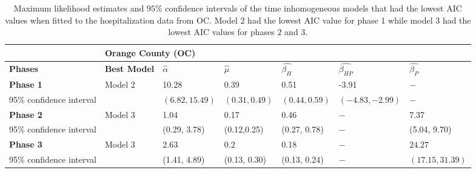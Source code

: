 \documentclass{article}
\begin{document}
\begin{appendices}
\begin{sidewaystable}[h]
\begin{tabular}{lllllll}
\hline
& \multicolumn{6}{l}{\textbf{Orange County (OC)}}\\ \hline
\textbf{Phases} & \textbf{Best Model} & $\hat{\alpha}$ & $\hat{\mu}$ & $\hat{\beta_{H}}$ & $\hat{\beta_{HP}}$ & $\hat{\beta_{P}}$\\ \hline
\textbf{Phase 1} & Model 2 & 10.28 & 0.39 & 0.51 & -3.91 & $-$\\ \hline
95\% confidence interval & & $(6.82, 15.49)$ & $(0.31, 0.49)$ & $(0.44, 0.59)$ & $(-4.83, -2.99)$ & $-$\\ \hline 
\textbf{Phase 2} & Model 3 & 1.04 & 0.17 & 0.46 & $-$ & 7.37 \\ \hline
95\% confidence interval & & (0.29, 3.78) & (0.12,0.25) & (0.27, 0.78) & $-$ & (5.04, 9.70) \\ \hline
\textbf{Phase 3} & Model 3 & 2.63 & 0.2 & 0.18 & $-$ & $24.27$\\ \hline
95\% confidence interval & & (1.41, 4.89) & (0.13, 0.30) & (0.13, 0.24)  & $-$ & $(17.15, 31.39)$\\ \hline
\end{tabular}
\caption{Maximum likelihood estimates and $95\%$ confidence intervals of the time inhomogeneous models that had the lowest AIC values when fitted to the hospitalization data from OC. Model $2$ had the lowest AIC value for phase 1 while model $3$ had the lowest AIC values for phases $2$ and $3$.}
\label{A2}
\end{sidewaystable}

\end{appendices}
\end{document}
